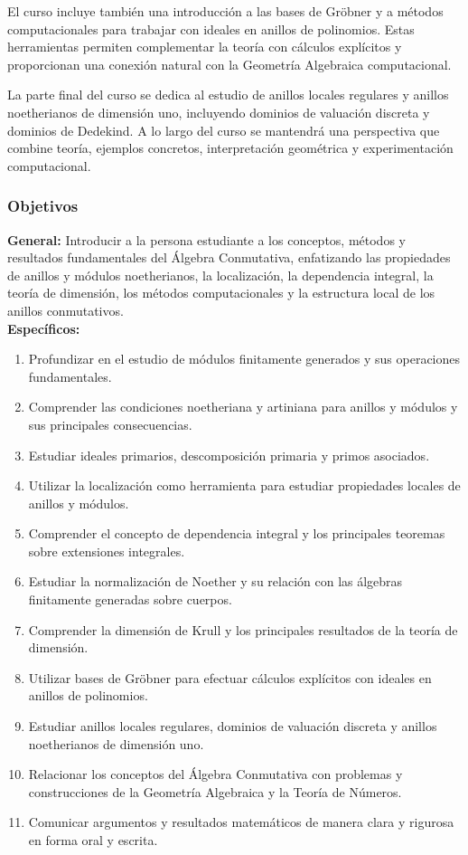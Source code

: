 \begin{refsection}
El curso incluye también una introducción a las bases de Gröbner y a métodos computacionales para trabajar con ideales en anillos de polinomios. Estas herramientas permiten complementar la teoría con cálculos explícitos y proporcionan una conexión natural con la Geometría Algebraica computacional.

La parte final del curso se dedica al estudio de anillos locales regulares y anillos noetherianos de dimensión uno, incluyendo dominios de valuación discreta y dominios de Dedekind. A lo largo del curso se mantendrá una perspectiva que combine teoría, ejemplos concretos, interpretación geométrica y experimentación computacional.


\subsubsection*{Objetivos}

\textbf{General:} Introducir a la persona estudiante a los conceptos, métodos y resultados fundamentales del Álgebra Conmutativa, enfatizando las propiedades de anillos y módulos noetherianos, la localización, la dependencia integral, la teoría de dimensión, los métodos computacionales y la estructura local de los anillos conmutativos. \\

\textbf{Específicos:}

\begin{enumerate}
    \item Profundizar en el estudio de módulos finitamente generados y sus operaciones fundamentales.
    \item Comprender las condiciones noetheriana y artiniana para anillos y módulos y sus principales consecuencias.
    \item Estudiar ideales primarios, descomposición primaria y primos asociados.
    \item Utilizar la localización como herramienta para estudiar propiedades locales de anillos y módulos.
    \item Comprender el concepto de dependencia integral y los principales teoremas sobre extensiones integrales.
    \item Estudiar la normalización de Noether y su relación con las álgebras finitamente generadas sobre cuerpos.
    \item Comprender la dimensión de Krull y los principales resultados de la teoría de dimensión.
    \item Utilizar bases de Gröbner para efectuar cálculos explícitos con ideales en anillos de polinomios.
    \item Estudiar anillos locales regulares, dominios de valuación discreta y anillos noetherianos de dimensión uno.
    \item Relacionar los conceptos del Álgebra Conmutativa con problemas y construcciones de la Geometría Algebraica y la Teoría de Números.
    \item Comunicar argumentos y resultados matemáticos de manera clara y rigurosa en forma oral y escrita.
\end{enumerate}



\end{refsection}
